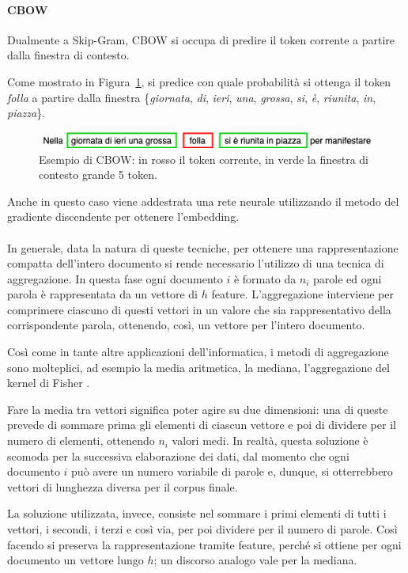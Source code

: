 \documentclass[12pt]{report}
\theoremstyle{definition}
\begin{document}
\paragraph{CBOW}
Dualmente a Skip-Gram, CBOW si occupa di predire il token corrente a partire dalla finestra di contesto.

Come mostrato in Figura~\ref{cbow}, si predice con quale probabilità si ottenga il token \textit{folla} a partire dalla finestra \{\textit{giornata}, \textit{di}, \textit{ieri}, \textit{una}, \textit{grossa}, \textit{si}, \textit{è}, \textit{riunita}, \textit{in}, \textit{piazza}\}.
\begin{figure}
    \centering
    \includegraphics[scale = 0.7]{images/cbow.png}
    \caption{Esempio di CBOW: in rosso il token corrente, in verde la finestra di contesto grande 5 token.}
    \label{cbow}
\end{figure}
Anche in questo caso viene addestrata una rete neurale utilizzando il metodo del gradiente discendente per ottenere l'embedding.
\\
\\
In generale, data la natura di queste tecniche, per ottenere una rappresentazione compatta dell'intero documento si rende necessario l'utilizzo di una tecnica di aggregazione.
In questa fase ogni documento $i$ è formato da $n_i$ parole ed ogni parola è rappresentata da un vettore di $h$ feature. L'aggregazione interviene per comprimere ciascuno di questi vettori in un valore che sia rappresentativo della corrispondente parola, ottenendo, così, un vettore per l'intero documento.

Così come in tante altre applicazioni dell'informatica, i metodi di aggregazione sono molteplici, ad esempio la media aritmetica, la mediana, l'aggregazione del kernel di Fisher \cite{19}.

Fare la media tra vettori significa poter agire su due dimensioni: una di queste prevede di sommare prima gli elementi di ciascun vettore e poi di dividere per il numero di elementi, ottenendo $n_i$ valori medi. In realtà, questa soluzione è scomoda per la successiva elaborazione dei dati, dal momento che ogni documento $i$ può avere un numero variabile di parole e, dunque, si otterrebbero vettori di lunghezza diversa per il corpus finale.

La soluzione utilizzata, invece, consiste nel sommare i primi elementi di tutti i vettori, i secondi, i terzi e così via, per poi dividere per il numero di parole. Così facendo si preserva la rappresentazione tramite feature, perché si ottiene per ogni documento un vettore lungo $h$; un discorso analogo vale per la mediana.
\end{document}
